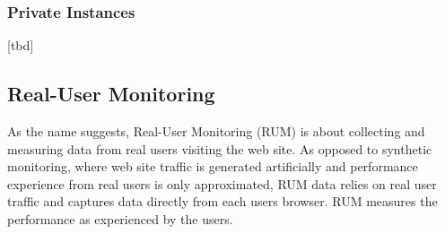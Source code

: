 



\subsubsection{Private Instances}

[tbd]




















\subsection{Real-User Monitoring}



As the name suggests, Real-User Monitoring (RUM) is about collecting and measuring data from real users visiting the web site.
As opposed to synthetic monitoring, where web site traffic is generated artificially and performance experience from real users is only approximated, RUM data relies on real user traffic and captures data directly from each users browser. 
RUM measures the performance as experienced by the users. %



